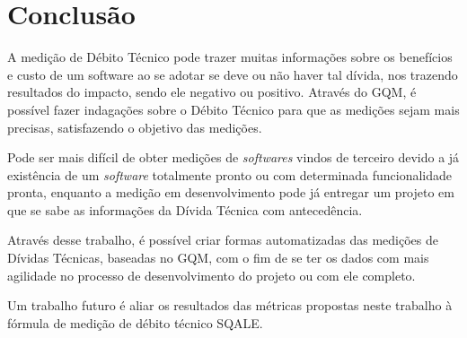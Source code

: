 \chapter[Conclusão]{Conclusão}
A medição de Débito Técnico pode trazer muitas informações sobre os benefícios e custo de um software ao 
se adotar se deve ou não haver tal dívida, nos trazendo resultados do impacto, sendo ele negativo ou positivo. Através do GQM, é possível fazer indagações sobre o Débito Técnico para que as medições sejam mais precisas, satisfazendo o objetivo das medições.


Pode ser mais difícil de obter medições de \textit{softwares} vindos de terceiro devido a já existência de um \textit{software} totalmente pronto ou com determinada funcionalidade pronta, enquanto a medição em desenvolvimento pode já entregar um projeto em que se sabe as informações da Dívida Técnica com antecedência.


Através desse trabalho, é possível criar formas automatizadas das medições de Dívidas Técnicas, baseadas no GQM, com o fim de se ter os dados com mais agilidade no processo de desenvolvimento do projeto ou com ele completo.

Um trabalho futuro é aliar os resultados das métricas propostas neste trabalho à fórmula de medição de débito técnico SQALE. 